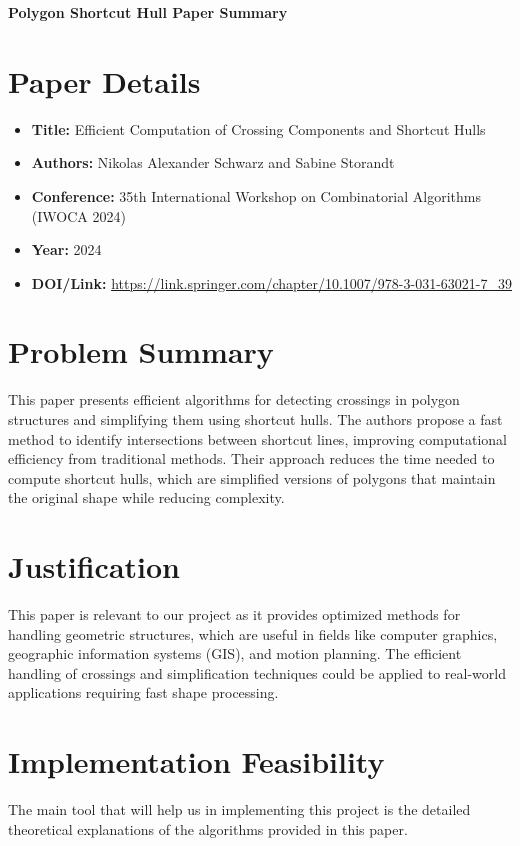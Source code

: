\documentclass[11pt,a4paper]{article}
\begin{document}
\begin{center}
    \Large\textbf{Polygon Shortcut Hull Paper Summary} \\
    \vspace{0.5cm}
\end{center}

\section*{Paper Details}
\begin{itemize}[leftmargin=*,noitemsep]
    \item \textbf{Title:} Efficient Computation of Crossing Components and Shortcut Hulls
    \item \textbf{Authors:} Nikolas Alexander Schwarz and Sabine Storandt
    \item \textbf{Conference:} 35th International Workshop on Combinatorial Algorithms (IWOCA 2024)
    \item \textbf{Year:} 2024
    \item \textbf{DOI/Link:} \url{https://link.springer.com/chapter/10.1007/978-3-031-63021-7_39}
\end{itemize}

\section{Problem Summary}
This paper presents efficient algorithms for detecting crossings in polygon structures and simplifying them using shortcut hulls. The authors propose a fast method to identify intersections between shortcut lines, improving computational efficiency from traditional methods. Their approach reduces the time needed to compute shortcut hulls, which are simplified versions of polygons that maintain the original shape while reducing complexity.

\section{Justification}
This paper is relevant to our project as it provides optimized methods for handling geometric structures, which are useful in fields like computer graphics, geographic information systems (GIS), and motion planning. The efficient handling of crossings and simplification techniques could be applied to real-world applications requiring fast shape processing.

\section{Implementation Feasibility}
The main tool that will help us in implementing this project is the detailed theoretical explanations of the algorithms provided in this paper.
\end{document}
